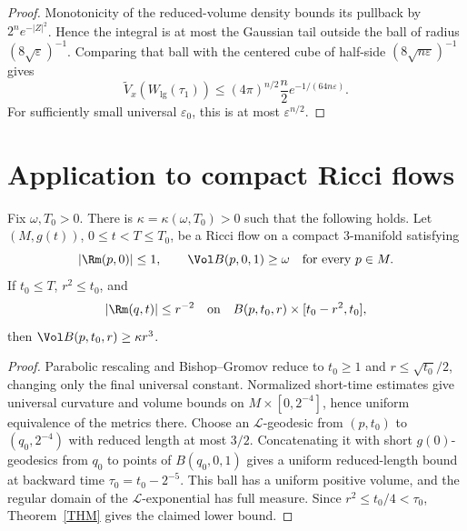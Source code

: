\begin{proof}
\sketch
{}
Monotonicity of the reduced-volume density bounds its pullback by
$2^ne^{-|Z|^2}$. Hence the integral is at most the Gaussian tail outside the
ball of radius $(8\sqrt\varepsilon)^{-1}$. Comparing that ball with the
centered cube of half-side $(8\sqrt{n\varepsilon})^{-1}$ gives
\[
  \widetilde V_x(W_{\mathrm{lg}}(\tau_1))
  \leq(4\pi)^{n/2}\frac n2
  e^{-1/(64n\varepsilon)}.
\]
For sufficiently small universal $\varepsilon_0$, this is at most
$\varepsilon^{n/2}$.
\end{proof}

\section{Application to compact Ricci flows}

\begin{theorem}
\label{thm:kappa-noncollapsed-compact-3-manifolds}
Fix $\omega,T_0>0$. There is $\kappa=\kappa(\omega,T_0)>0$ such that
the following holds. Let $(M,g(t))$, $0\leq t<T\leq T_0$, be a Ricci flow
on a compact $3$-manifold satisfying
\[
  |\Rm(p,0)|\leq1,
  \qquad
  \Vol B(p,0,1)\geq\omega
  \quad\text{for every }p\in M.
\]
If $t_0\leq T$, $r^2\leq t_0$, and
\[
  |\Rm(q,t)|\leq r^{-2}
  \quad\text{on}\quad
  B(p,t_0,r)\times[t_0-r^2,t_0],
\]
then
$\Vol B(p,t_0,r)\geq\kappa r^3$.
\end{theorem}

\begin{proof}
\sketch
{}
Parabolic rescaling and Bishop--Gromov reduce to
$t_0\geq1$ and $r\leq\sqrt{t_0}/2$, changing only the final universal
constant. Normalized short-time estimates give universal curvature and volume
bounds on $M\times[0,2^{-4}]$, hence uniform equivalence of the metrics there.
Choose an $\mathcal L$-geodesic from $(p,t_0)$ to
$(q_0,2^{-4})$ with reduced length at most $3/2$. Concatenating it with
short $g(0)$-geodesics from $q_0$ to points of $B(q_0,0,1)$ gives a uniform
reduced-length bound at backward time
$\tau_0=t_0-2^{-5}$. This ball has a uniform positive volume, and the regular
domain of the $\mathcal L$-exponential has full measure. Since
$r^2\leq t_0/4<\tau_0$, Theorem~\ref{THM} gives the claimed lower bound.
\end{proof}
